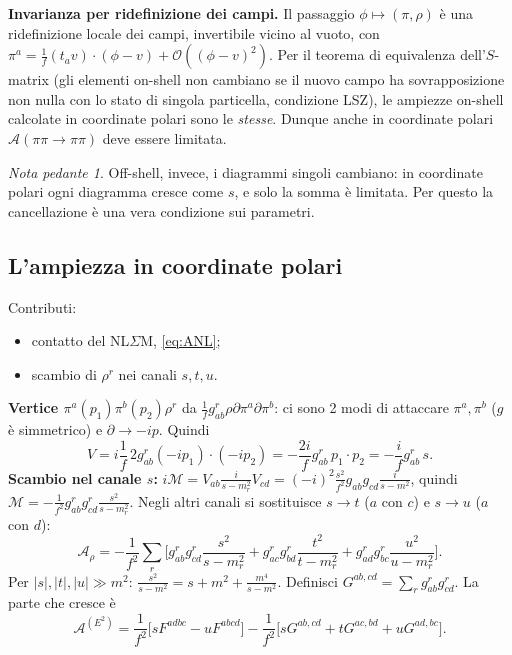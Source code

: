 \documentclass[11pt,a4paper]{article}
\numberwithin{equation}{section}
\theoremstyle{remark}
\newtheorem*{pedante}{Nota pedante}
\begin{document}
\textbf{Invarianza per ridefinizione dei campi.} Il passaggio $\phi\mapsto(\pi,\rho)$ è una ridefinizione locale dei campi, invertibile vicino al vuoto, con $\pi^a=\frac1f(t_av)\cdot(\phi-v)+\mathcal O((\phi-v)^2)$. Per il teorema di equivalenza dell'$S$-matrix (gli elementi on-shell non cambiano se il nuovo campo ha sovrapposizione non nulla con lo stato di singola particella, condizione LSZ), le ampiezze on-shell calcolate in coordinate polari sono le \emph{stesse}. Dunque anche in coordinate polari $\mathcal A(\pi\pi\to\pi\pi)$ deve essere limitata.
\begin{pedante}
Off-shell, invece, i diagrammi singoli cambiano: in coordinate polari ogni diagramma cresce come $s$, e solo la somma è limitata. Per questo la cancellazione è una vera condizione sui parametri.
\end{pedante}

\subsection{L'ampiezza in coordinate polari}

Contributi:
\begin{itemize}
\item contatto del NL$\Sigma$M, \eqref{eq:ANL};
\item scambio di $\rho^r$ nei canali $s,t,u$.
\end{itemize}
\textbf{Vertice $\pi^a(p_1)\pi^b(p_2)\rho^r$} da $\frac1fg^r_{ab}\rho\partial\pi^a\partial\pi^b$: ci sono 2 modi di attaccare $\pi^a,\pi^b$ ($g$ è simmetrico) e $\partial\to-ip$. Quindi
\[
V=i\frac1f\,2g^r_{ab}(-ip_1)\cdot(-ip_2)=-\frac{2i}{f}g^r_{ab}\,p_1\!\cdot p_2=-\frac{i}{f}g^r_{ab}\,s .
\]
\textbf{Scambio nel canale $s$:} $i\mathcal M=V_{ab}\frac{i}{s-m_r^2}V_{cd}=(-i)^2\frac{s^2}{f^2}g_{ab}g_{cd}\frac{i}{s-m^2}$, quindi $\mathcal M=-\frac{1}{f^2}g^r_{ab}g^r_{cd}\frac{s^2}{s-m_r^2}$. Negli altri canali si sostituisce $s\to t$ ($a$ con $c$) e $s\to u$ ($a$ con $d$):
\begin{equation}
\mathcal A_\rho=-\frac{1}{f^2}\sum_r\Big[g^r_{ab}g^r_{cd}\frac{s^2}{s-m_r^2}+g^r_{ac}g^r_{bd}\frac{t^2}{t-m_r^2}+g^r_{ad}g^r_{bc}\frac{u^2}{u-m_r^2}\Big].
\end{equation}
Per $|s|,|t|,|u|\gg m^2$: $\frac{s^2}{s-m^2}=s+m^2+\frac{m^4}{s-m^2}$. Definisci $G^{ab,cd}=\sum_rg^r_{ab}g^r_{cd}$. La parte che cresce è
\[
\mathcal A^{(E^2)}=\frac1{f^2}\big[sF^{adbc}-uF^{abcd}\big]-\frac1{f^2}\big[sG^{ab,cd}+tG^{ac,bd}+uG^{ad,bc}\big].
\]
\end{document}
